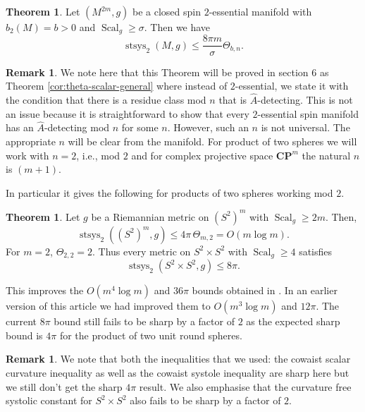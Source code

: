 \documentclass[11pt,reqno]{amsart}
\numberwithin{equation}{section}
\numberwithin{equation}{section}
\theoremstyle{definition}
\newtheorem*{theorem*}{Theorem}
\newtheorem{remark}[theorem]{Remark}
\newtheorem{theorema}{Theorem}
\newcommand{\CP}{\mathbf{CP}}
\DeclareMathOperator{\Scal}{Scal}
\DeclareMathOperator{\stsys}{stsys}
\newcommand{\Ah}{\widehat A}
\begin{document}
\begin{theorem*}
    Let $(M^{2m},g)$ be a closed spin $2$-essential manifold with $b_2(M)=b>0$ and $\Scal_g \geq \sigma$. Then we have 
\[ \stsys_2(M,g) \leq \frac{8\pi m}{\sigma} \Theta_{b,n}.\]
\end{theorem*}
\begin{remark}
    We note here that this Theorem will be proved in section 6 as Theorem \ref{cor:theta-scalar-general} where instead of $2$-essential, we state it with the condition that there is a residue class mod $n$ that is $\Ah$-detecting. This is not an issue because it is straightforward to show that every $2$-essential spin manifold has an $\Ah$-detecting mod $n$ for some $n$. However, such an $n$ is not universal. The appropriate $n$ will be clear from the manifold. For product of two spheres we will work with $n=2$, i.e., mod $2$ and for complex projective space $\CP^m$ the natural $n$ is $(m+1)$. 
\end{remark}
In particular it gives the following for products of two spheres working mod $2$.
\begin{theorema} \label{thmC}
Let \(g\) be a Riemannian metric on \((S^2)^m\) with \(\Scal_g\ge2m\). Then,
\[
\stsys_2((S^2)^m,g)
\le
4\pi\,\Theta_{m,2} = O(m\log m) .
\]
For $m=2$, \(\Theta_{2,2}=2\). Thus every metric on \(S^2\times S^2\) with \(\Scal_g\ge4\) satisfies
\[
\stsys_2(S^2\times S^2,g)
\le
8\pi.
\]
\end{theorema}

This improves the \(O(m^4 \log m)\) and \(36\pi\) bounds obtained in \cite{Stryker}. In an earlier version of this article \cite{Kumar2026} we had improved them to $O(m^3 \log m)$ and $12\pi$. The current $8\pi$ bound still fails to be sharp by a factor of $2$ as the expected sharp bound is \(4\pi\) for the product of two unit round spheres. 
\begin{remark}
    We note that both the inequalities that we used: the cowaist scalar curvature inequality as well as the cowaist systole inequality are sharp here but we still don't get the sharp $4\pi$ result. We also emphasise that the curvature free systolic constant for $S^2 \times S^2$ also fails to be sharp by a factor of $2$. 
\end{remark}
\end{document}
